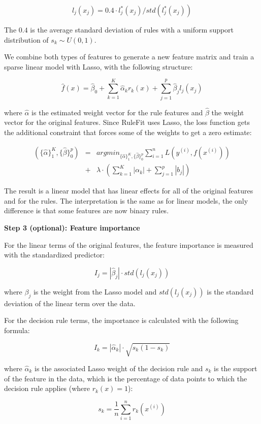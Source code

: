 \documentclass[
  12pt,
]{krantz}
\begin{document}
\[l_j(x_j)=0.4\cdot{}l^*_j(x_j)/std(l^*_j(x_j))\]

The \(0.4\) is the average standard deviation of rules with a uniform support distribution of \(s_k\sim{}U(0,1)\).

We combine both types of features to generate a new feature matrix and train a sparse linear model with Lasso, with the following structure:

\[\hat{f}(x)=\hat{\beta}_0+\sum_{k=1}^K\hat{\alpha}_k{}r_k(x)+\sum_{j=1}^p\hat{\beta}_j{}l_j(x_j)\]

where \(\hat{\alpha}\) is the estimated weight vector for the rule features and \(\hat{\beta}\) the weight vector for the original features.
Since RuleFit uses Lasso, the loss function gets the additional constraint that forces some of the weights to get a zero estimate:

\begin{align*}
(\{\hat{\alpha}\}_1^K,\{\hat{\beta}\}_0^p) & = & argmin_{\{\hat{\alpha}\}_1^K,\{\hat{\beta}\}_0^p}\sum_{i=1}^n L(y^{(i)},f(x^{(i)}))  \\
 & + & \lambda\cdot\left(\sum_{k=1}^K|\alpha_k| + \sum_{j=1}^p|b_j|\right)
\end{align*}

The result is a linear model that has linear effects for all of the original features and for the rules.
The interpretation is the same as for linear models, the only difference is that some features are now binary rules.

\textbf{Step 3 (optional): Feature importance}

For the linear terms of the original features, the feature importance is measured with the standardized predictor:

\[I_j=|\hat{\beta}_j|\cdot std(l_j(x_j))\]

where \(\beta_j\) is the weight from the Lasso model and \(std(l_j(x_j))\) is the standard deviation of the linear term over the data.

For the decision rule terms, the importance is calculated with the following formula:

\[I_k=|\hat{\alpha}_k|\cdot\sqrt{s_k(1-s_k)}\]

where \(\hat{\alpha}_k\) is the associated Lasso weight of the decision rule and \(s_k\) is the support of the feature in the data, which is the percentage of data points to which the decision rule applies (where \(r_k(x)=1\)):

\[s_k=\frac{1}{n}\sum_{i=1}^n r_k(x^{(i)})\]
\end{document}
